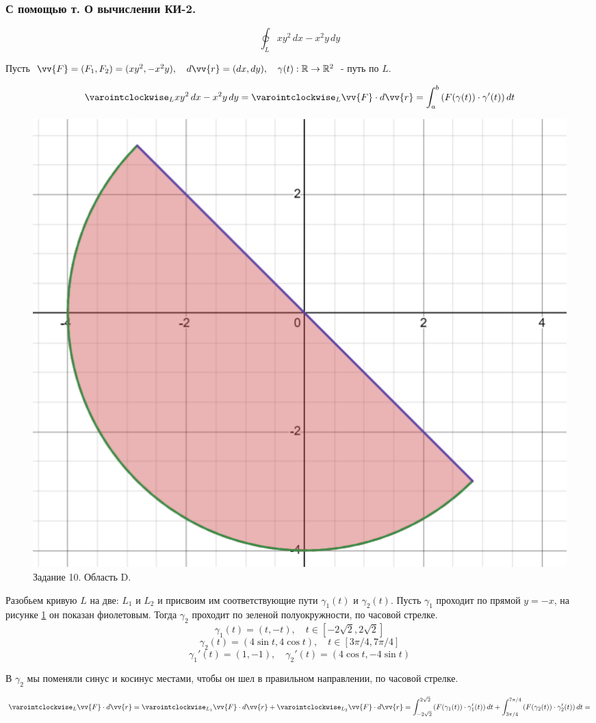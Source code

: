 \subsubsection{С помощью т. О вычислении КИ-2.}

$$\varointclockwise_L xy^2 \,dx - x^2y \,dy$$
\begin{center}
    
Пусть $\vv{F} = (F_1, F_2) = (xy^2, - x^2y), \quad d\vv{r} = (dx,dy), \quad \gamma(t): \mathbb{R} \rightarrow \mathbb{R}^2$ - путь по $L$.

$$\varointclockwise_L xy^2 \,dx - x^2y \,dy = \varointclockwise_L \vv{F} \cdot d\vv{r} = \int_a^b \left(F(\gamma(t))\cdot\gamma'(t)\right)dt$$

\begin{figure}[h!t]
    \centering
    \includegraphics[width=0.75\linewidth]{Task10/Figure_D.png}
    \caption{Задание 10. Область D.}
    \label{task-10:figure-D}
\end{figure}

Разобьем кривую $L$ на две: $L_1$ и $L_2$ и присвоим им соответствующие пути $\gamma_1(t)$ и $\gamma_2(t)$. Пусть $\gamma_1$ проходит по прямой $y=-x$, на рисунке \ref{task-10:figure-D} он показан фиолетовым. Тогда $\gamma_2$ проходит по зеленой полуокружности, по часовой стрелке.
$$\gamma_1(t) = (t,-t), \quad t\in[-2\sqrt{2}, 2\sqrt{2}]$$
$$\gamma_2(t) = (4\sin{t}, 4\cos{t}), \quad t\in[3\pi/4, 7\pi/4]$$
$$\gamma_1'(t) = (1,-1), \quad \gamma_2'(t) = (4\cos{t}, -4\sin{t})$$


В $\gamma_2$ мы поменяли синус и косинус местами, чтобы он шел в правильном направлении, по часовой стрелке.

$$\varointclockwise_L \vv{F} \cdot d\vv{r} = \varointclockwise_{L_1} \vv{F} \cdot d\vv{r} + \varointclockwise_{L_2} \vv{F} \cdot d\vv{r} = \int_{-2\sqrt{2}}^{2\sqrt{2}} \left(F(\gamma_1(t))\cdot\gamma_1'(t)\right)dt + \int_{3\pi/4}^{7\pi/4} \left(F(\gamma_2(t))\cdot\gamma_2'(t)\right)dt = $$


\end{center}
